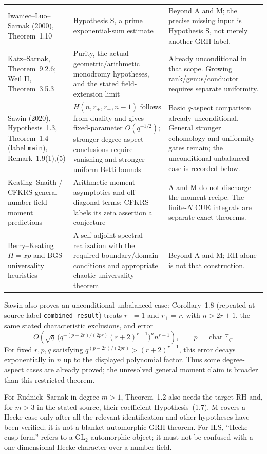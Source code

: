 \documentclass[11pt,a4paper]{article}
\theoremstyle{definition}\newtheorem{definition}{Definition}
\begin{document}
\begin{longtable}{p{}p{}p{}}
Iwaniec--Luo--Sarnak (2000), Theorem~1.10 & Hypothesis S, a prime exponential-sum estimate & Beyond A and M; the precise missing input is Hypothesis S, not merely another GRH label.\\
Katz--Sarnak, Theorem~9.2.6; Weil II, Theorem~3.5.3 & Purity, the actual geometric/arithmetic monodromy hypotheses, and the stated field-extension limit & Already unconditional in that scope. Growing rank/genus/conductor requires separate uniformity.\\
Sawin (2020), Hypothesis~1.3, Theorem~1.4 (label \nolinkurl{main}), Remark~1.9(1),(5) & $H(n,r_+,r_-,n-1)$ follows from duality and gives fixed-parameter $O(q^{-1/2})$; stronger degree-aspect conclusions require vanishing and stronger uniform Betti bounds & Basic $q$-aspect comparison already unconditional. General stronger cohomology and uniformity gates remain; the unconditional unbalanced case is recorded below.\\
Keating--Snaith / CFKRS general number-field moment predictions & Arithmetic moment asymptotics and off-diagonal terms; CFKRS labels its zeta assertion a conjecture & A and M do not discharge the moment recipe. The finite-$N$ CUE integrals are separate exact theorems.\\
Berry--Keating $H=xp$ and BGS universality heuristics & A self-adjoint spectral realization with the required boundary/domain conditions and appropriate chaotic universality theorem & Beyond A and M; RH alone is not that construction.\\\hline
\end{longtable}
\endgroup

Sawin also proves an unconditional unbalanced case: Corollary~1.8 (repeated at source label \nolinkurl{combined-result}) treats $r_-=1$ and $r_+=r$, with $n>2r+1$, the same stated characteristic exclusions, and error
\[
 O\!\left(\sqrt q\,\bigl(q^{-(p-2r)/(2pr)}(r+2)^{r+1}\bigr)^n n^{r+1}\right),
 \qquad p=\operatorname{char}\mathbb F_q.
\]
For fixed $r,p,q$ satisfying $q^{(p-2r)/(2pr)}>(r+2)^{r+1}$, this error decays exponentially in $n$ up to the displayed polynomial factor. Thus some degree-aspect cases are already proved; the unresolved general moment claim is broader than this restricted theorem.

For Rudnick--Sarnak in degree $m>1$, Theorem~1.2 also needs the target RH and, for $m>3$ in the stated source, their coefficient Hypothesis~(1.7). M covers a Hecke case only after all the relevant identification and other hypotheses have been verified; it is not a blanket automorphic GRH theorem. For ILS, ``Hecke cusp form'' refers to a $\mathrm{GL}_2$ automorphic object; it must not be confused with a one-dimensional Hecke character over a number field.
\end{document}
